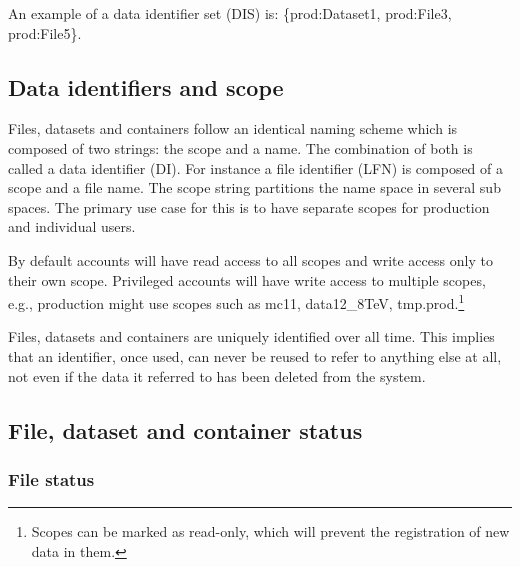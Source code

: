 \documentclass{atlasnote}
\begin{document}
{\hfill{}\hfill}

\noindent An example of a data identifier set (DIS) is: \{prod:Dataset1, prod:File3, prod:File5\}.

\subsection{Data identifiers and scope}
\label{overview_Dataset:data-identifiers-and-scope}

Files, datasets and containers follow an identical naming scheme which is composed of two strings: the scope and a name. The combination of both is called a data identifier (DI). For instance a file identifier (LFN) is composed of a scope and a file name. The scope string partitions the name space in several sub spaces. The primary use case for this is to have separate scopes for production and individual users.

By default accounts will have read access to all scopes and write access only to their own scope. Privileged accounts will have write access to multiple scopes, e.g., production might use scopes such as mc11, data12\_8TeV, tmp.prod.\footnote{Scopes can be marked as read-only, which will prevent the registration of new data in them.}

Files, datasets and containers are uniquely identified over all time. This implies that an identifier, once used, can never be reused to refer to anything else at all, not even if the data it referred to has been deleted from the system.

\subsection{File, dataset and container status}

\subsubsection{File status}
\label{sec:file-status}
\end{document}
